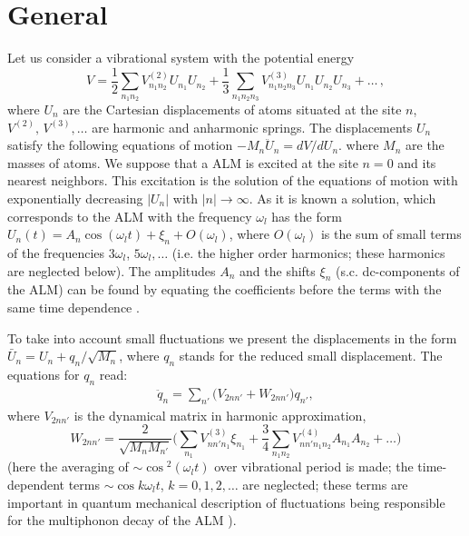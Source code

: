 \section{General} 
Let us consider a vibrational system with the potential energy  
\begin{equation} 
{V} = \frac{1}{2} \sum_{n_{1} n_{2}}\!{V^{(2)}_{n_{1} n_{2}} 
{U}_{n_{1}} {U} _{n_{2}}} 
+ \frac{1}{3}\! \sum_{n_{1} n_{2} n_{3}}\!\!{V^{(3)}_{n_{1} n_{2} n_{3}} 
{U}_{n_{1}} {U}_{n_{2}} {U}_{n_{3}}} + \ldots\,, 
\label{eq:v} 
\end{equation} 
where ${U}_{n}$ are the Cartesian displacements of atoms situated at the site 
$n$, $V^{(2)},\, V^{(3)},\ldots$ are harmonic and anharmonic springs. The 
displacements $U_n$ satisfy the following equations of motion 
$ - M_n \ddot{U}_n = dV/dU_n$.
where $M_{n}$ are the masses of atoms. We suppose that a ALM is excited
at the site $n=0$ and its nearest neighbors. This excitation is the solution 
of the equations of motion with exponentially decreasing  $|U_n|$ 
with $|n| \rightarrow \infty$. As it is known \cite{sivtak,page} a
solution, which corresponds to the ALM with the frequency  $\omega_l$ has the 
form $U_n(t)= A_n \cos(\omega_l t) + \xi_n + O(\omega_l)$, where $O(\omega_l)$ 
is the sum of small terms of the frequencies $3\omega_l$,  
$5\omega_l, \ldots$ (i.e. the higher order harmonics; these harmonics are 
neglected below).  The amplitudes $A_{n}$ and the shifts $\xi_{n}$ 
(s.c. dc-components of the ALM) can be 
found by equating the coefficients before the terms with the same time 
dependence \cite{sivtak,page,flach}. 

To take into account small fluctuations we present the displacements in the  
form $\bar{U}_n = U_n + q_n/ \sqrt{M_n}$, where $q_n $ stands for the reduced  
small displacement. The equations for ${q}_{n}$ read: 
\begin{eqnarray}
\ddot{q}_{n}=  
\sum_{n'}{{\big (}V_{2 n n'}+W_{2 n n'}{\big )}{q}_{n'}},
\label{eq:b}
\end{eqnarray}
where $V_{2 n n'}$ is the dynamical matrix in harmonic approximation, 
\begin{equation}
W_{2 n n'} = \frac{2}{\sqrt{M_{n} M_{n'}}} {\Big (} 
\sum_{n_{1}} V^{(3)}_{n n' n_{1}}\xi_{n_{1}} + 
\frac{3}{4} \sum_{n_{1} n_{2}} V^{(4)}_{n n'n_{1} n_{2}} 
A_{n_{1}} A_{n_{2}} + \ldots {\Big )} \label{eq:c}
\end{equation}
(here the averaging of $\sim \cos{\!^2\!(\omega_l t)}$
over vibrational period is made; the
time-dependent terms $\sim \cos{k \omega_{l} t}$, $k=0,1,2,\ldots$ are 
neglected; these terms are important in quantum mechanical description
of fluctuations being responsible for the multiphonon decay of the ALM
\cite{hizhrev,hizhnev}).  

